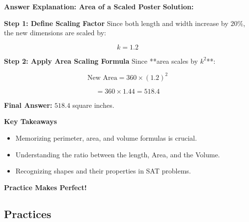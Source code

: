 \documentclass{beamer}
\begin{document}
\begin{frame}{\textbf{Answer Explanation: Area of a Scaled Poster}}
    \textbf{Solution:}  

    \vspace{0.3cm}
    \textbf{Step 1: Define Scaling Factor}  
    Since both length and width increase by \( 20\% \),  
    the new dimensions are scaled by:

    \[
    k = 1.2
    \]

    \vspace{0.3cm}
    \textbf{Step 2: Apply Area Scaling Formula}  
    Since **area scales by \( k^2 \)**:

    \[
    \text{New Area} = 360 \times (1.2)^2
    \]

    \[
    = 360 \times 1.44 = 518.4
    \]

    \vspace{0.3cm}
    \textbf{Final Answer:} \( \boxed{518.4} \) square inches.
\end{frame}


\begin{frame}{\textbf{Key Takeaways}}
    \begin{itemize}
        \item Memorizing perimeter, area, and volume formulas is crucial.
        \item Understanding the ratio between the length, Area, and the Volume.
        \item Recognizing shapes and their properties in SAT problems.
    \end{itemize}
    \vfill
    \centering
    \textcolor{novelPurple}{\Huge \textbf{Practice Makes Perfect!}}
\end{frame}

\begin{frame}
\section{Practices}
\end{frame}
\end{document}
